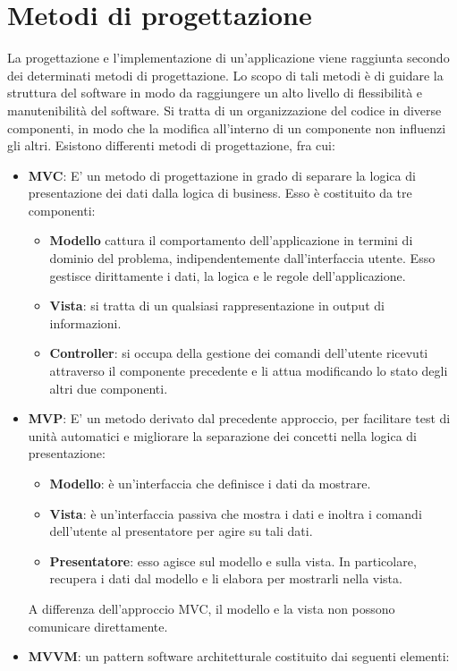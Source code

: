 \section{Metodi di progettazione}
La progettazione e l'implementazione di un'applicazione viene raggiunta secondo dei determinati metodi di progettazione. Lo scopo di tali metodi è di guidare la struttura del software in modo da raggiungere un alto livello di flessibilità e manutenibilità del software. Si tratta di un organizzazione del codice in diverse componenti, in modo che la modifica all'interno di un componente non influenzi gli altri. Esistono differenti metodi di progettazione, fra cui:
\begin{itemize}
\item \textbf{MVC}: E' un metodo di progettazione in grado di separare la logica di presentazione dei dati dalla logica di business. Esso è costituito da tre componenti: 
\begin{itemize}
\item \textbf{Modello} cattura il comportamento dell'applicazione in termini di dominio del problema, indipendentemente dall'interfaccia utente. Esso gestisce dirittamente i dati, la logica e le regole dell'applicazione.
\item \textbf{Vista}: si tratta di un qualsiasi rappresentazione in output di informazioni.
\item \textbf{Controller}: si occupa della gestione dei comandi dell'utente ricevuti attraverso il componente precedente e li attua modificando lo stato degli altri due componenti.
\end{itemize}
\item \textbf{MVP}: E' un metodo derivato dal precedente approccio, per facilitare test di unità automatici e migliorare la separazione dei concetti nella logica di presentazione:
\begin{itemize}
\item \textbf{Modello}: è un'interfaccia che definisce i dati da mostrare.
\item \textbf{Vista}: è un'interfaccia passiva che mostra i dati e inoltra i comandi dell'utente al presentatore per agire su tali dati.
\item \textbf{Presentatore}: esso agisce sul modello e sulla vista. In particolare, recupera i dati dal modello e li elabora per mostrarli nella vista.
\end{itemize}
A differenza dell'approccio MVC, il modello e la vista non possono comunicare direttamente.
\item \textbf{MVVM}: un pattern software architetturale costituito dai seguenti elementi:

\end{itemize}
